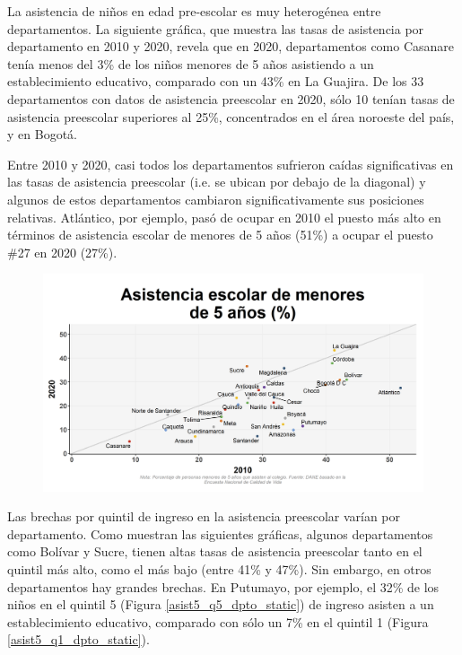         La asistencia de niños en edad pre-escolar es muy heterogénea entre departamentos.  La siguiente gráfica, que muestra las tasas de asistencia por departamento en 2010 y 2020, revela que en 2020, departamentos como Casanare tenía  menos del 3\% de los niños menores de 5 años asistiendo a un establecimiento educativo, comparado con un 43\% en La Guajira. De los 33 departamentos con datos de asistencia preescolar en 2020, sólo 10 tenían tasas de asistencia preescolar superiores al 25\%, concentrados en el área noroeste del país, y en Bogotá.
        
        Entre 2010 y 2020, casi todos los departamentos sufrieron caídas significativas en las tasas de asistencia preescolar (i.e. se ubican por debajo de la diagonal) y algunos de estos departamentos cambiaron significativamente sus posiciones relativas. Atlántico, por ejemplo, pasó de ocupar en 2010 el puesto más alto en términos de asistencia escolar de menores de 5 años (51\%) a ocupar el puesto \#27 en 2020 (27\%).     

    \begin{figure}[H]
        \caption[Asistencia escolar de menores de 5 años por departamentos - 2010 VS 2020 ]{\label{asist5_dpto_scatter} }
        \begin{center}
        \includegraphics[width=\textwidth,keepaspectratio]{img/var_99_scatter_time.png}
        \end{center}
    \end{figure}

        Las brechas por quintil de ingreso en la asistencia preescolar varían por departamento. Como muestran las siguientes gráficas, algunos departamentos como Bolívar y Sucre, tienen altas tasas de asistencia preescolar tanto en el quintil más alto, como el más bajo (entre 41\% y 47\%). Sin embargo, en otros departamentos hay grandes brechas. En Putumayo, por ejemplo, el 32\% de los niños en el quintil 5 (Figura \ref{asist5_q5_dpto_static}) de ingreso asisten a un establecimiento educativo, comparado con sólo un 7\% en el quintil 1 (Figura \ref{asist5_q1_dpto_static}). 

